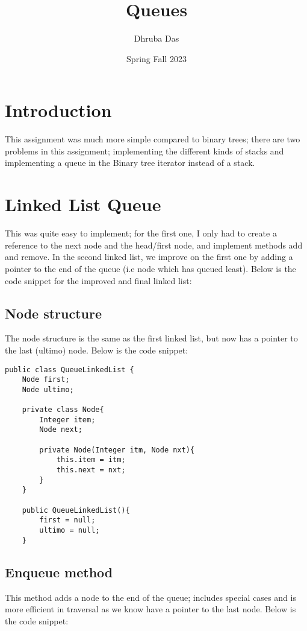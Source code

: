 \documentclass[a4paper,11pt]{article}
\begin{document}
\title{
    \textbf{Queues}
}
\author{Dhruba Das}
\date{Spring Fall 2023}

\maketitle

\section*{Introduction}
This assignment was much more simple compared to binary trees; there are two problems in this assignment; implementing the different kinds of stacks and implementing a queue in the Binary tree iterator instead of a stack.


\section*{Linked List Queue}

This was quite easy to implement; for the first one, I only had to create a reference to the next node and the head/first node, and implement methods add and remove. In the second linked list, we improve on the first one by adding a pointer to the end of the queue (i.e node which has queued least). Below is the code snippet for the improved and final linked list:


\subsection*{Node structure }

The node structure is the same as the first linked list, but now has a pointer to the last (ultimo) node. Below is the code snippet:

\begin{verbatim}
public class QueueLinkedList {
    Node first;
    Node ultimo;

    private class Node{
        Integer item;
        Node next;

        private Node(Integer itm, Node nxt){
            this.item = itm;
            this.next = nxt;
        }
    }

    public QueueLinkedList(){
        first = null;
        ultimo = null;
    }
\end{verbatim}

\subsection*{Enqueue method}
This method adds a node to the end of the queue; includes special cases and is more efficient in traversal as we know have a pointer to the last node. Below is the code snippet:
\end{document}

